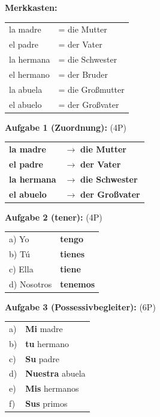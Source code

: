 \documentclass[11pt, a4paper]{article}
\newcommand{\fachfarbe}{spanisch}
\newcommand{\loesung}[1]{\textcolor{loesung}{\textbf{#1}}}
\newcommand{\es}[1]{\textcolor{\fachfarbe}{\textbf{#1}}}
\begin{document}
\textbf{Merkkasten:}
\begin{tabular}{ll}
la madre & = die Mutter \\
el padre & = der Vater \\
la hermana & = die Schwester \\
el hermano & = der Bruder \\
la abuela & = die Großmutter \\
el abuelo & = der Großvater \\
\end{tabular}

\vspace{1em}

\textbf{Aufgabe 1 (Zuordnung):} (4P)
\begin{tabular}{ll}
\es{la madre} & $\rightarrow$ \loesung{die Mutter} \\
\es{el padre} & $\rightarrow$ \loesung{der Vater} \\
\es{la hermana} & $\rightarrow$ \loesung{die Schwester} \\
\es{el abuelo} & $\rightarrow$ \loesung{der Großvater} \\
\end{tabular}

\vspace{1em}

\textbf{Aufgabe 2 (tener):} (4P)
\begin{tabular}{ll}
a) Yo & \loesung{tengo} \\
b) Tú & \loesung{tienes} \\
c) Ella & \loesung{tiene} \\
d) Nosotros & \loesung{tenemos} \\
\end{tabular}

\vspace{1em}

\textbf{Aufgabe 3 (Possessivbegleiter):} (6P)
\begin{tabular}{ll}
a) & \loesung{Mi} madre \\
b) & \loesung{tu} hermano \\
c) & \loesung{Su} padre \\
d) & \loesung{Nuestra} abuela \\
e) & \loesung{Mis} hermanos \\
f) & \loesung{Sus} primos \\
\end{tabular}

\vspace{1em}
\end{document}
